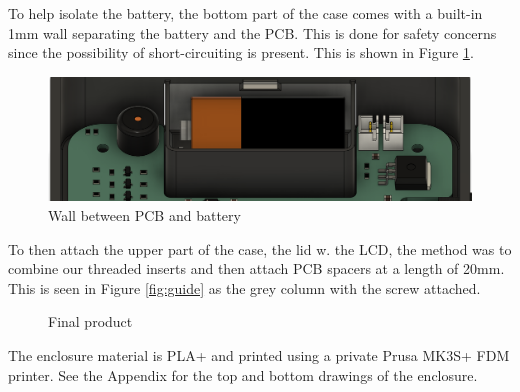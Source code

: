To help isolate the battery, the bottom part of the case comes with a built-in 1mm wall separating the battery and the PCB. This is done for safety concerns since the possibility of short-circuiting is present. This is shown in Figure \ref{fig:batiso}.
\begin{figure}[h]
    \centering
    \includegraphics[width=0.855\linewidth]{images/batiso.png}
    \caption{Wall between PCB and battery}
    \label{fig:batiso}
\end{figure}
\newpage 
\noindent 
To then attach the upper part of the case, the lid w. the LCD, the method was to combine our threaded inserts and then attach PCB spacers at a length of 20mm. This is seen in Figure \ref{fig:guide} as the grey column with the screw attached.

\begin{figure}[h]
  \centering
  \hfill
  \caption{Final product}
  \label{fig:lid}
\end{figure}

\noindent The enclosure material is PLA+ and printed using a private Prusa MK3S+ FDM printer. See the Appendix for the top and bottom drawings of the enclosure.